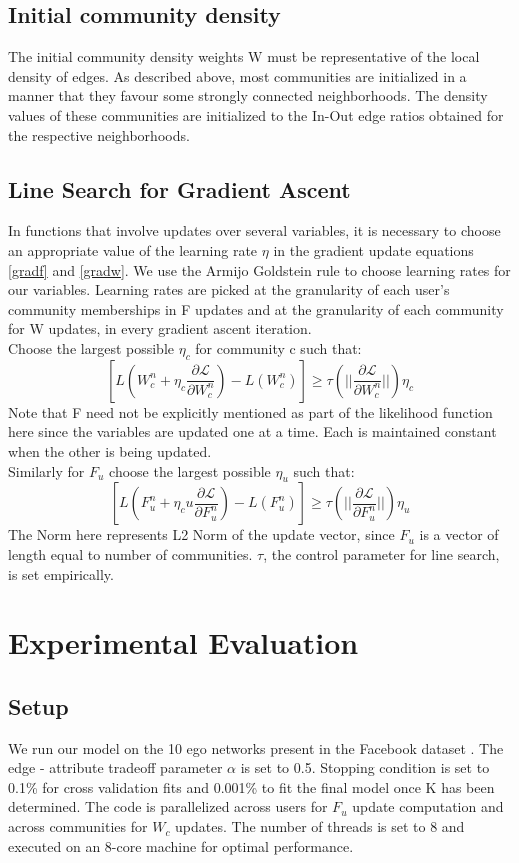 \documentclass[11pt]{article}
\begin{document}
\subsection*{Initial community density}
The initial community density weights W must be representative of the local density of edges. As described above, most communities are initialized in a manner that they favour some strongly connected neighborhoods. The density values of these communities are initialized to the In-Out edge ratios obtained for the respective neighborhoods.

\subsection*{Line Search for Gradient Ascent}
In functions that involve updates over several variables, it is necessary to choose an appropriate value of the learning rate $\eta$ in the gradient update equations \ref{gradf} and \ref{gradw}. We use the Armijo Goldstein rule to choose learning rates for our variables. Learning rates are picked at the granularity of each user's community memberships in F updates and at the granularity of each community for W updates, in every gradient ascent iteration.
\\[3pt]
Choose the largest possible $\eta_c$ for community c such that:
$$[L(W_{c}^n  + \eta_c	 \frac{\partial \mathcal{L}}{\partial W_{c}^n}) - L(W_{c}^n)]  \geq \tau(||\frac{\partial \mathcal{L}}{\partial W_{c}^n}||)\eta_c$$
Note that F need not be explicitly mentioned as part of the likelihood function here since the variables are updated one at a time. Each is maintained constant when the other is being updated.
\\[5pt]
Similarly for $F_{u}$ choose the largest possible $\eta_u$ such that:
$$[L(F_{u}^n  + \eta_cu \frac{\partial \mathcal{L}}{\partial F_{u}^n}) - L(F_{u}^n)]  \geq \tau(||\frac{\partial \mathcal{L}}{\partial F_{u}^n}||)\eta_u$$
The Norm here represents L2 Norm of the update vector, since $F_{u}$ is a vector of length equal to number of communities. $\tau$, the control parameter for line search, is set empirically.
\section{Experimental Evaluation}
\subsection{Setup}
We run our model on the 10 ego networks present in the Facebook dataset \cite{facebook dataset}. The edge - attribute tradeoff parameter $\alpha$ is set to 0.5. Stopping condition is set to 0.1\% for cross validation fits and 0.001\% to fit the final model once K has been determined.  The code is parallelized across users for $F_{u}$ update computation and across communities for $W_{c}$ updates. The number of threads is set to 8 and executed on an 8-core machine for optimal performance.
\end{document}
